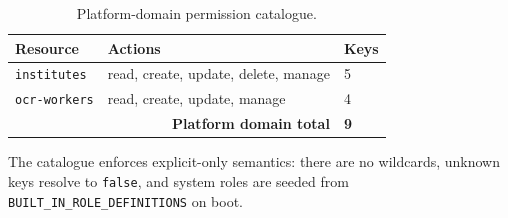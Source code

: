 \begin{table}[htbp]
\centering
\small
\begin{tabular}{@{}p{3.7cm}p{7.7cm}p{2.3cm}@{}}
\toprule
\textbf{Resource} & \textbf{Actions} & \textbf{Keys} \\
\midrule
\texttt{institutes} & read, create, update, delete, manage & 5 \\
\texttt{ocr-workers} & read, create, update, manage & 4 \\
\midrule
\multicolumn{2}{r}{\textbf{Platform domain total}} & \textbf{9} \\
\bottomrule
\end{tabular}
\caption{Platform-domain permission catalogue.}
\label{tab:perm-platform}
\end{table}

\noindent The catalogue enforces explicit-only semantics: there are no
wildcards, unknown keys resolve to \texttt{false}, and system roles are
seeded from \texttt{BUILT\_IN\_ROLE\_DEFINITIONS} on boot.